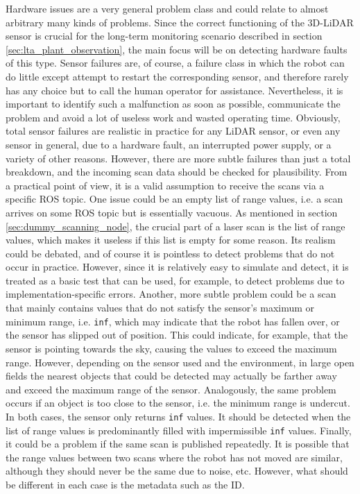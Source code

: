 \documentclass[english, master, utf8]{base/thesis_KBS}
\newcommand{\code}[1]{\colorbox{light-gray}{\texttt{#1}}}
\begin{document}
\noindent
Hardware issues are a very general problem class and could relate to almost arbitrary many kinds of problems. Since the correct functioning of the 3D-LiDAR sensor is
crucial for the long-term monitoring scenario described in section \ref{sec:lta_plant_observation}, the main focus will be on detecting hardware faults of this type. 
Sensor failures are, of course, a failure class in which the robot can do little except attempt to restart the corresponding sensor, and therefore rarely has any choice but to 
call the human operator for assistance. Nevertheless, it is important to identify such a malfunction as soon as possible, communicate the problem and avoid a lot of useless work 
and wasted operating time. Obviously, total sensor failures are realistic in practice for any LiDAR sensor, or even any sensor in general, due to a hardware fault, an interrupted
power supply, or a variety of other reasons. However, there are more subtle failures than just a total breakdown, and the incoming scan data should be checked for plausibility.
From a practical point of view, it is a valid assumption to receive the scans via a specific ROS topic. One issue could be an empty list of range values, i.e. a scan arrives on
some ROS topic but is essentially vacuous. As mentioned in section \ref{sec:dummy_scanning_node}, the crucial part of a laser scan is the list of range values, which makes it 
useless if this list is empty for some reason. Its realism could be debated, and of course it is pointless to detect problems that do not occur in practice. However, since it is
relatively easy to simulate and detect, it is treated as a basic test that can be used, for example, to detect problems due to implementation-specific errors.
Another, more subtle problem could be a scan that mainly contains values that do not satisfy the sensor's maximum or minimum range, i.e. \code{inf}, which may indicate that
the robot has fallen over, or the sensor has slipped out of position. This could indicate, for example, that the sensor is pointing towards the sky, causing the values to exceed
the maximum range. However, depending on the sensor used and the environment, in large open fields the nearest objects that could be detected may actually be farther away and exceed
the maximum range of the sensor. Analogously, the same problem occurs if an object is too close to the sensor, i.e. the minimum range is undercut. In both cases, the sensor only
returns \code{inf} values. It should be detected when the list of range values is predominantly filled with impermissible \code{inf} values. Finally, it could be a problem if the
same scan is published repeatedly. It is possible that the range values between two scans where the robot has not moved are similar, although they should never be the same due to
noise, etc. However, what should be different in each case is the metadata such as the ID.\newline
\end{document}
